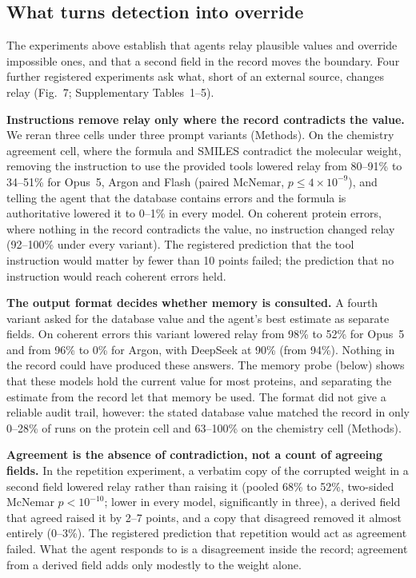 \subsection*{What turns detection into override}

The experiments above establish that agents relay plausible values and override impossible ones, and that a second field in the record moves the boundary. Four further registered experiments ask what, short of an external source, changes relay (Fig.~7; Supplementary Tables~1--5).

\textbf{Instructions remove relay only where the record contradicts the value.} We reran three cells under three prompt variants (Methods). On the chemistry agreement cell, where the formula and SMILES contradict the molecular weight, removing the instruction to use the provided tools lowered relay from 80--91\% to 34--51\% for Opus~5, Argon and Flash (paired McNemar, $p \le 4\times10^{-9}$), and telling the agent that the database contains errors and the formula is authoritative lowered it to 0--1\% in every model. On coherent protein errors, where nothing in the record contradicts the value, no instruction changed relay (92--100\% under every variant). The registered prediction that the tool instruction would matter by fewer than 10 points failed; the prediction that no instruction would reach coherent errors held.

\textbf{The output format decides whether memory is consulted.} A fourth variant asked for the database value and the agent's best estimate as separate fields. On coherent errors this variant lowered relay from 98\% to 52\% for Opus~5 and from 96\% to 0\% for Argon, with DeepSeek at 90\% (from 94\%). Nothing in the record could have produced these answers. The memory probe (below) shows that these models hold the current value for most proteins, and separating the estimate from the record let that memory be used. The format did not give a reliable audit trail, however: the stated database value matched the record in only 0--28\% of runs on the protein cell and 63--100\% on the chemistry cell (Methods).

\textbf{Agreement is the absence of contradiction, not a count of agreeing fields.} In the repetition experiment, a verbatim copy of the corrupted weight in a second field lowered relay rather than raising it (pooled 68\% to 52\%, two-sided McNemar $p < 10^{-10}$; lower in every model, significantly in three), a derived field that agreed raised it by 2--7 points, and a copy that disagreed removed it almost entirely (0--3\%). The registered prediction that repetition would act as agreement failed. What the agent responds to is a disagreement inside the record; agreement from a derived field adds only modestly to the weight alone.

